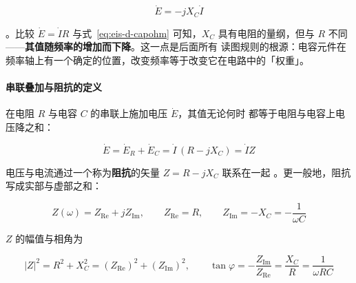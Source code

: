 \begin{equation}
\dot E=-jX_C\dot I
\label{eq:eis-d-capohm}
\end{equation}

。比较 $\dot E=\dot I R$ 与式~\eqref{eq:eis-d-capohm}
可知，$X_C$ 具有电阻的量纲，但与 $R$ 不同——\textbf{其值随频率的增加而下降}。这一点是后面所有
读图规则的根源：电容元件在频率轴上有一个确定的位置，改变频率等于改变它在电路中的「权重」。

\paragraph{串联叠加与阻抗的定义} 在电阻 $R$ 与电容 $C$ 的串联上施加电压 $\dot E$，其值无论何时
都等于电阻与电容上电压降之和：

\begin{equation}
\dot E=\dot E_R+\dot E_C=\dot I\,(R-jX_C)=\dot I Z
\label{eq:eis-d-series}
\end{equation}

电压与电流通过一个称为\textbf{阻抗}的矢量 $Z=R-jX_C$ 联系在一起
。更一般地，阻抗写成实部与虚部之和：

\begin{equation}
Z(\omega)=Z_{\mathrm{Re}}+jZ_{\mathrm{Im}},\qquad
Z_{\mathrm{Re}}=R,\qquad Z_{\mathrm{Im}}=-X_C=-\frac{1}{\omega C}
\label{eq:eis-d-zdef}
\end{equation}

$Z$ 的幅值与相角为

\begin{equation}
\lvert Z\rvert^{2}=R^{2}+X_C^{2}
=\left(Z_{\mathrm{Re}}\right)^{2}+\left(Z_{\mathrm{Im}}\right)^{2},
\qquad
\tan\varphi=-\frac{Z_{\mathrm{Im}}}{Z_{\mathrm{Re}}}=\frac{X_C}{R}
=\frac{1}{\omega RC}
\label{eq:eis-d-zmod}
\end{equation}

